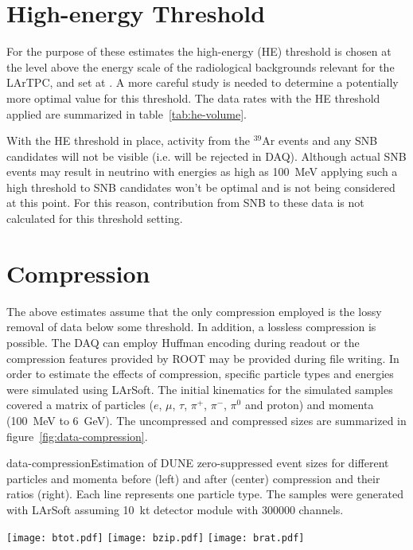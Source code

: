 \section{High-energy Threshold}

For the purpose of these estimates the  high-energy (HE) threshold is chosen at the level above 
the energy scale of the radiological backgrounds relevant for the LArTPC, and set at  \chargehethreshold.
A more careful study is needed to determine a potentially more optimal value for this threshold.
The data rates with the HE threshold applied are summarized in table~\ref{tab:he-volume}.



With the HE threshold in place, activity from the $^{39}$Ar events and any SNB
candidates will not be visible (i.e. will be rejected in DAQ).
Although actual SNB events may result in neutrino with energies as high as
\SI{100}{\MeV} applying such a high threshold to SNB candidates won't be optimal and is not being considered at this point.
For this reason, contribution from SNB to these data is not calculated for this threshold setting.


\section{Compression}

The above estimates assume that the only compression employed is the
lossy removal of data below some threshold.
In addition, a lossless compression is possible.
The DAQ can employ Huffman encoding during readout or the compression
features provided by ROOT may be provided during file writing.
In order to estimate the effects of compression, specific particle
types and energies were simulated using LArSoft.
The initial kinematics for the simulated samples covered a matrix of
particles ($e$, $\mu$, $\tau$, $\pi^+$, $\pi^-$, $\pi^0$ and proton) and momenta
(\SI{100}{\MeV} to \SI{6}{\GeV}).
The uncompressed and compressed sizes are summarized in figure~\ref{fig:data-compression}.

\begin{cdrfigure}{data-compression}{Estimation of DUNE zero-suppressed event sizes for
    different particles and momenta before (left) and after (center)
    compression and their ratios (right).
    Each line represents one particle type.
    The samples were generated with LArSoft assuming
    \SI{10}{\kilo\tonne} detector module with \num{300000} channels.}

  \texttt{[image: btot.pdf]}
  \texttt{[image: bzip.pdf]}
  \texttt{[image: brat.pdf]}

\end{cdrfigure}

